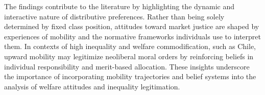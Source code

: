 \documentclass[
  12pt,
]{article}
\begin{document}
The findings contribute to the literature by highlighting the dynamic
and interactive nature of distributive preferences. Rather than being
solely determined by fixed class position, attitudes toward market
justice are shaped by experiences of mobility and the normative
frameworks individuals use to interpret them. In contexts of high
inequality and welfare commodification, such as Chile, upward mobility
may legitimize neoliberal moral orders by reinforcing beliefs in
individual responsibility and merit-based allocation. These insights
underscore the importance of incorporating mobility trajectories and
belief systems into the analysis of welfare attitudes and inequality
legitimation.
\end{document}
